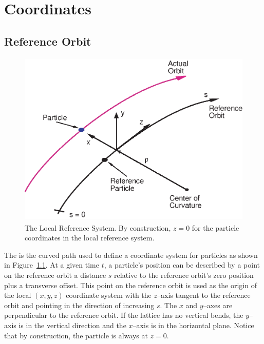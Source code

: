 \chapter{Coordinates}

\section{Reference Orbit}
\label{s:ref}

\begin{figure}[!b]
\centering
\includegraphics[height=8.4cm]{local-coords.eps}
\caption[The Local Reference System.]
{The Local Reference System. By construction, $z = 0$ for
the particle coordinates in the local reference system.}
\label{f:local.coords}
\end{figure}

The  is the curved path used to define a coordinate
system for particles as shown in Figure~\ref{f:local.coords}.  At a
given time $t$, a particle's position can be described by a point on
the reference orbit a distance $s$ relative to the reference orbit's
zero position plus a transverse offset. This point on the reference
orbit is used as the origin of the local $(x, y, z)$ coordinate system
with the $z$--axis tangent to the reference orbit and pointing in the
direction of increasing $s$. The $x$ and $y$--axes are
perpendicular to the reference orbit. If the lattice has no vertical
bends, the $y$--axis is in the vertical direction and the $x$--axis is
in the horizontal plane. Notice that by construction, the particle is
always at $z = 0$.

